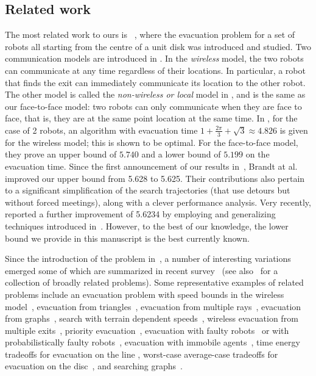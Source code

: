 \documentclass[
final
]{dmtcs-episciences}
\newcommand{\ff}{face-to-face }
\theoremstyle{definition}
\begin{document}
\subsection{Related work}
\label{sec: related work}




The most related work to ours is ~\cite{CGGKMP}, where the evacuation problem for a set of robots all
starting from the centre of a unit disk was introduced and studied.  Two communication models are introduced in \cite{CGGKMP}. In the {\em wireless} model,
the two robots can communicate at any time regardless of their locations. In particular, a robot that finds the exit can immediately communicate its location to the other
robot. The other model is called the  {\em non-wireless or local} model in \cite{CGGKMP}, and is the same as our \ff model:  two robots can only communicate when they are face to face,  that is, they are at the same point location at the same time. In \cite{CGGKMP}, for the case of 2 robots, an algorithm with  evacuation time $1 +\frac{2\pi}{3} + \sqrt{3} \approx 4.826$ is  given for the wireless model; this is shown to be optimal. For the \ff  model,  they prove an upper bound of 
$5.740$ and a lower bound of  $5.199$ on the evacuation time. 
Since the first announcement of our results in~\cite{CzyzowiczGKNOV15}, 
Brandt at al.~\cite{Watten2017} improved our upper bound from 5.628 to 5.625. Their contributions also pertain to a significant simplification of the search trajectories (that use detours but without forced meetings), along with a clever performance analysis. 
Very recently, \cite{disser2019evacuating} reported a further improvement of 5.6234 by employing and generalizing techniques introduced in~\cite{Watten2017}.
However, to the best of our knowledge, the lower bound we provide in this manuscript is the best currently known. 

Since the introduction of the problem in~\cite{CGGKMP}, a number of interesting variations emerged some of which are summarized in recent survey~\cite{CGK19search} (see also~\cite{flocchini2019distributed} for a collection of broadly related problems).
Some representative examples of related problems include 
an evacuation problem with speed bounds in the wireless model~\cite{lamprou2016fast},
evacuation from triangles~\cite{CzyzowiczKKNOS15,ChuangpishitMNO17},
evacuation from multiple rays~\cite{BrandtFRW20},
evacuation from graphs~\cite{Borowiecki0DK16},
search with terrain dependent speeds~\cite{CzyzowiczKKNOS17},
wireless evacuation from multiple exits~\cite{czyzowicz2018evacuating,PattanayakR0S18},
priority evacuation~\cite{CGKKKNOS18b,CzyzowiczGKKKNO18},
evacuation with faulty robots~\cite{czyzowicz2017evacuation,pattanayak2019chauffeuring,GKLPP19Algosensors} or with probabilistically faulty robots~\cite{bgmp2020probabilistically},	
evacuation with immobile agents~\cite{GKKa16,dmtcs:5528},
time energy tradeoffs for evacuation on the line \cite{czyzowiczICALP2019,kranakis2009time},
worst-case average-case tradeoffs for evacuation on the disc~\cite{chuangpishit2018average}, 
and searching graphs~\cite{angelopoulos2019expanding}.
\end{document}
